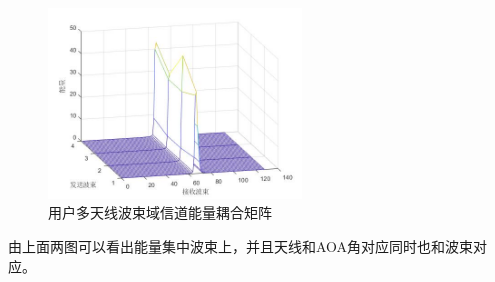 \documentclass[bachelor,nocolorlinks, printoneside]{seuthesis} %
\begin{document}
\begin{Main}
\begin{figure}[htbp!]
	\centering \includegraphics[width=0.6\textwidth]{img/2_3.jpg} \caption{用户多天线波束域信道能量耦合矩阵}
\end{figure}

由上面两图可以看出能量集中波束上，并且天线和AOA角对应同时也和波束对应。


\end{Main}
\end{document}
